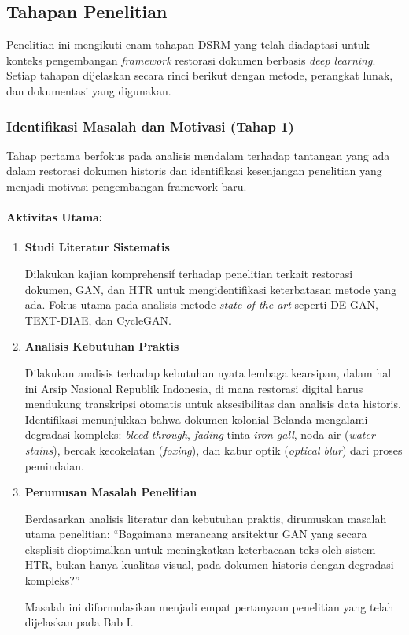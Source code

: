\documentclass[12pt,a4paper]{article}
\begin{document}
\subsection{Tahapan Penelitian}
\label{subsec:tahapan-penelitian}

Penelitian ini mengikuti enam tahapan DSRM yang telah diadaptasi untuk konteks pengembangan \textit{framework} restorasi dokumen berbasis \textit{deep learning}. Setiap tahapan dijelaskan secara rinci berikut dengan metode, perangkat lunak, dan dokumentasi yang digunakan.

\subsubsection{Identifikasi Masalah dan Motivasi (Tahap 1)}
Tahap pertama berfokus pada analisis mendalam terhadap tantangan yang ada dalam restorasi dokumen historis dan identifikasi kesenjangan penelitian yang menjadi motivasi pengembangan framework baru.

\paragraph{Aktivitas Utama:}

\begin{enumerate}[label=\arabic*., leftmargin=*, nosep]
\item \textbf{Studi Literatur Sistematis}

Dilakukan kajian komprehensif terhadap penelitian terkait restorasi dokumen, GAN, dan HTR untuk mengidentifikasi keterbatasan metode yang ada. Fokus utama pada analisis metode \textit{state-of-the-art} seperti DE-GAN, TEXT-DIAE, dan CycleGAN.

\item \textbf{Analisis Kebutuhan Praktis}

Dilakukan analisis terhadap kebutuhan nyata lembaga kearsipan, dalam hal ini Arsip Nasional Republik Indonesia, di mana restorasi digital harus mendukung transkripsi otomatis untuk aksesibilitas dan analisis data historis. Identifikasi menunjukkan bahwa dokumen kolonial Belanda mengalami degradasi kompleks: \textit{bleed-through}, \textit{fading} tinta \textit{iron gall}, noda air (\textit{water stains}), bercak kecokelatan (\textit{foxing}), dan kabur optik (\textit{optical blur}) dari proses pemindaian.

\item \textbf{Perumusan Masalah Penelitian}

Berdasarkan analisis literatur dan kebutuhan praktis, dirumuskan masalah utama penelitian: ``Bagaimana merancang arsitektur GAN yang secara eksplisit dioptimalkan untuk meningkatkan keterbacaan teks oleh sistem HTR, bukan hanya kualitas visual, pada dokumen historis dengan degradasi kompleks?''

Masalah ini diformulasikan menjadi empat pertanyaan penelitian yang telah dijelaskan pada Bab I.
\end{enumerate}
\end{document}

